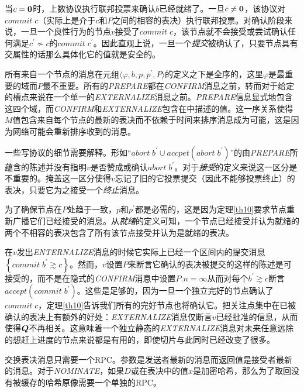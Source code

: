 当$c={\bm 0}$时，上数协议执行联邦投票来确认$b$已经就绪了。一旦$c\neq {\bm 0}$，该协议对$commit\;c$（实际上是介于$c$和$P$之间的相容的表决）执行联邦投票。对确认阶段来说，一旦一个良性行为的节点$v$接受了$commit\;c$，该节点就不会接受或尝试确认任何满足$c^{\prime}\not\sim c$的$commit\;c^{\prime}$。因此直观上说，一旦一个\textit{提交}被确认了，只要节点具有{\quorum}交属性的话那么具体化它的值就是安全的。

所有来自一个节点的消息在元组$\langle \varphi,b,p,p^{\prime},P\rangle$的定义之下是全序的，这里$\varphi$是最重要的域而$P$最不重要。所有的\textsl{PREPARE}都在\textsl{CONFIRM}消息之前，转而对于给定的槽点来说在一个单一的\textsl{EXTERNALIZE}消息之前。\textsl{PREPARE}信息显式地包含这四个域，而\textsl{CONFIRM}和\textsl{EXTERNALIZE}包含在中描述的值。这一序关系使得$M$值包含来自每个节点的最新的表决而不依赖于时间来排序消息成为可能，这是因为网络可能会重新排序收到的消息。

一些写协议的细节需要解释。形如``$abort\;b^{\prime}\cup accpet(abort\;b^{\prime})$''的由\textsl{PREPARE}所蕴含的陈述并没有指明$v$是否赞成或确认$abort\;b^{\prime}$。对于\textit{接受}的定义来说这一区分是不重要的。掩盖这一区分使得$v$忘记了旧的它投票提交（因此不能够投票终止）的表决，只要它为之接受一个\textit{终止}消息。

为了确保节点在$P$处趋于一致，$p$和$p^{\prime}$都是必需的，这是因为定理\ref{th10}要求节点重新广播它们已经接受的消息。从\textit{就绪}的定义可知，一个节点已经接受并认为就绪的两个不相容的表决包含了所有该节点接受并认为是就绪的表决。

在$v$发出\textsl{ENTERNALIZE}消息的时候它实际上已经一个区间内的提交消息$\left\{commit \; b^{\prime}\gtrsim c\right\}$。然而，$v$设置$P$来断言它确认的表决被提交的这样的陈述是可接受的，而不是在隐式的\textsl{CONFIRM}消息中设置$P.n=\infty$从而对每个$b^{\prime}\gtrsim c$断言$accept(commit\;b^{\prime})$。这些是足够的，因为一旦一个独立完好的节点确认了$commit\;c$，定理\ref{th10}告诉我们所有的完好节点也将确认它。把关注点集中在已被确认的表决上有额外的好处：\textsl{EXTERNALIZE}消息仅断言$v$已经批准的信息，从而使得${\bm Q}$不再相关。这意味着一个独立静态的\textsl{EXTERNALIZE}消息对未来任意远除的想赶上进度的节点来说都是有用的，即使{\quorum}切片与此同时已经改变了很多。

交换表决消息只需要一个RPC。参数是发送者最新的消息而返回值是接受者最新的消息。对于\textsl{NOMINATE}，如果$D$或在表决中的值$x$是加密哈希，那么为了取回没有被缓存的哈希原像需要一个单独的RPC。